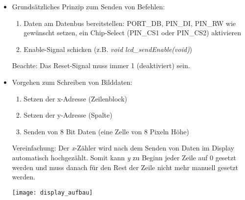 \begin{itemize}
\item
Grundsätzliches Prinzip zum Senden von Befehlen:
\begin{enumerate}
	\item
	Daten am Datenbus bereitstellen: PORT\_DB, PIN\_DI, PIN\_RW wie gewünscht setzen, ein Chip-Select (PIN\_CS1 oder PIN\_CS2) aktivieren
	
	\item
	Enable-Signal schicken (z.B. \textit{void lcd\_sendEnable(void)})
\end{enumerate}
Beachte: Das Reset-Signal muss immer 1 (deaktiviert) sein.

\item Vorgehen zum Schreiben von Bilddaten:
\begin{enumerate}
	\item Setzen der x-Adresse (Zeilenblock)
	\item Setzen der y-Adresse (Spalte)
	\item Senden von 8 Bit Daten (eine \glqq{}Zelle\grqq{} von 8 Pixeln Höhe)
\end{enumerate}
Vereinfachung: Der \textit{x}-Zähler wird nach dem Senden von Daten im Display automatisch hochgezählt.
Somit kann \textit{y} zu Beginn jeder Zeile auf 0 gesetzt werden und muss danach für den Rest der Zeile nicht mehr manuell gesetzt werden.

\begin{center}\texttt{[image: display\_aufbau]}\end{center}


\end{itemize}

